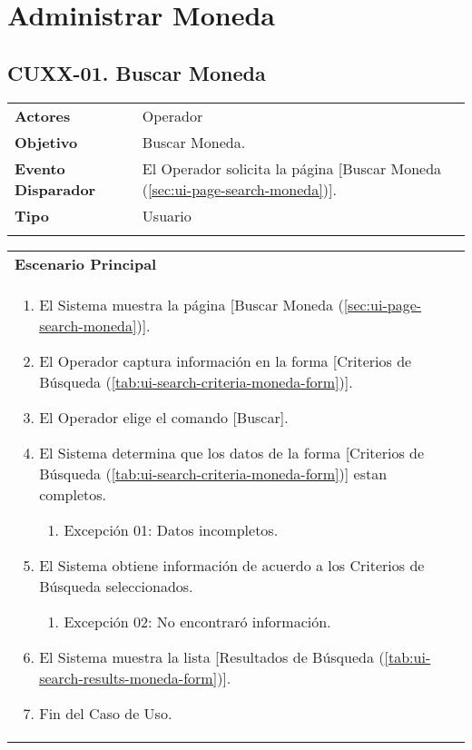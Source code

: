 \clearpage
\section{Administrar Moneda} \label{sec:cf-uc-admin-moneda}

\subsection{CUXX-01. Buscar Moneda} \label{sec:cu-search-Moneda}

\begin{tabular}{ p{3.5cm} p{11.5cm} }
	\textbf{Actores} & Operador\\
	\textbf{Objetivo} & Buscar Moneda.\\
	\textbf{Evento Disparador} & El Operador solicita la página [Buscar Moneda (\ref{sec:ui-page-search-moneda})].\\
	\textbf{Tipo} & Usuario\\
	\\
\end{tabular}

\begin{tabular}{ p{15.5cm} }
	\textbf{Escenario Principal} \\
	\begin{enumerate}
		\item El Sistema muestra la página [Buscar Moneda (\ref{sec:ui-page-search-moneda})].
		\item El Operador captura información en la forma [Criterios de Búsqueda (\ref{tab:ui-search-criteria-moneda-form})].
		\item El Operador elige el comando [Buscar].
		\item El Sistema determina que los datos de la forma [Criterios de Búsqueda (\ref{tab:ui-search-criteria-moneda-form})] estan completos.
			\begin{enumerate}
				\item Excepción 01: Datos incompletos.
			\end{enumerate}
		\item El Sistema obtiene información de acuerdo a los Criterios de Búsqueda seleccionados.
			\begin{enumerate}
				\item Excepción 02: No encontraró información.
			\end{enumerate}
		\item El Sistema muestra la lista [Resultados de Búsqueda (\ref{tab:ui-search-results-moneda-form})].
		\item Fin del Caso de Uso.
	\end{enumerate}
\end{tabular}

